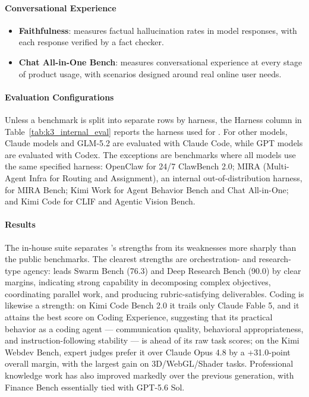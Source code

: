 \paragraph{Conversational Experience}
\begin{itemize}[leftmargin=12pt]
  \item \textbf{Faithfulness}: measures factual hallucination rates in model responses, with each response verified by a fact checker.
  \item \textbf{Chat All-in-One Bench}: measures conversational experience at every stage of product usage, with scenarios designed around real online user needs.
\end{itemize}

\paragraph{Evaluation Configurations} Unless a benchmark is split into separate rows by harness, the Harness column in Table~\ref{tab:k3_internal_eval} reports the harness used for . For other models, Claude models and GLM-5.2 are evaluated with Claude Code, while GPT models are evaluated with Codex. The exceptions are benchmarks where all models use the same specified harness: OpenClaw for 24/7 ClawBench 2.0; MIRA (Multi-Agent Infra for Routing and Assignment), an internal out-of-distribution harness, for MIRA Bench; Kimi Work for Agent Behavior Bench and Chat All-in-One; and Kimi Code for CLIF and Agentic Vision Bench.

\paragraph{Results} The in-house suite separates 's strengths from its weaknesses more sharply than the public benchmarks. The clearest strengths are orchestration- and research-type agency:  leads Swarm Bench (76.3) and Deep Research Bench (90.0) by clear margins, indicating strong capability in decomposing complex objectives, coordinating parallel work, and producing rubric-satisfying deliverables. Coding is likewise a strength: on Kimi Code Bench 2.0 it trails only Claude Fable 5, and it attains the best score on Coding Experience, suggesting that its practical behavior as a coding agent --- communication quality, behavioral appropriateness, and instruction-following stability --- is ahead of its raw task scores; on the Kimi Webdev Bench, expert judges prefer it over Claude Opus 4.8 by a +31.0-point overall margin, with the largest gain on 3D/WebGL/Shader tasks. Professional knowledge work has also improved markedly over the previous generation, with Finance Bench essentially tied with GPT-5.6 Sol.

